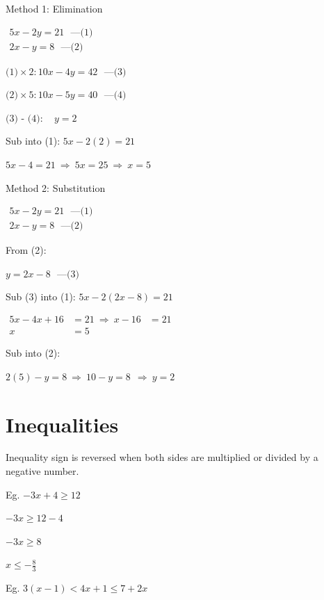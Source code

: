 \documentclass[twocolumn]{article}
\begin{document}
Method 1: Elimination

$
\begin{gathered}
	5 x-2 y=21 \ \ \ \text{---(1)}\\
	2 x-y=8 \ \ \ \text{---(2)}
\end{gathered}
$

$\text{(1)} \times 2: 10 x-4 y=42  \ \ \ \text{---(3)}$

$\text{(2)}\times 5: 10 x-5 y=40  \ \ \ \text{---(4)}$

$\text{(3) - (4)}: \quad y=2$

Sub into (1): $5 x-2(2)=21$

$5 x-4 =21 \ \Rightarrow \ 5 x =25 \ \Rightarrow \	x =5$

\bigskip 

\noindent 
Method 2: Substitution

$
\begin{gathered}
	5 x-2 y=21 \ \ \ \text{---(1)} \\
	2 x-y=8 \ \ \ \text{---(2)}
\end{gathered}
$

From (2):

$
y=2 x-8  \ \ \ \text{---(3)}
$

Sub (3) into (1): $5 x-2(2 x-8)=21$

$
\begin{aligned}
	5 x-4 x+16 & =21 \ \Rightarrow \ x-16 & =21 \\
	x & =5
\end{aligned}
$

Sub into (2):

$	2(5)-y=8 \ \Rightarrow \ 10-y=8 \ \ \Rightarrow  \	y=2 $

\section*{Inequalities}

\noindent 
Inequality sign is reversed when both sides are multiplied or divided by a negative number.

\bigskip 

\noindent 
Eg. $-3x + 4  \geq 12$

$-3x \geq 12-4$

$-3x \geq 8$

$x \leq - \frac{8}{3}$

\bigskip 

\noindent 
Eg. $3(x-1)<4 x+1 \leq 7+2 x$
\end{document}
